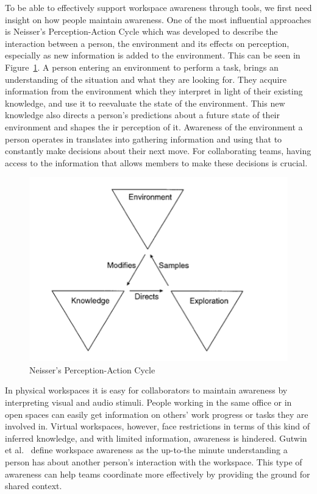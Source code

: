 \documentclass[conference]{IEEEtran}
\begin{document}
To be able to effectively support workspace awareness through tools, we first need insight on how people maintain awareness. One of the most influential approaches is Neisser's Perception-Action Cycle \cite{Neisser76} which was developed to describe the interaction between a person, the environment and its effects on perception, especially as new information is added to the environment.  This can be seen in Figure~\ref{fig:neisser}. A person entering an environment to perform a task, brings an understanding of the situation and what they are looking for. They acquire information from the environment which they interpret in light of their existing knowledge, and use it to reevaluate the state of the environment. This new knowledge also directs a person's predictions about a future state of their environment and shapes the  ir perception of it. Awareness of the environment a person operates in translates into gathering information and using that to constantly make decisions about their next move. For collaborating teams, having access to the information that allows members to make these decisions is crucial.


\begin{figure}[htb]
\centering
\includegraphics[scale=0.5]{neisser}
\caption{Neisser's Perception-Action Cycle}
\label{fig:neisser}
\end{figure}

In physical workspaces it is easy for collaborators to maintain awareness by interpreting visual and audio stimuli. People working in the same office or in open spaces can easily get information on others' work progress or tasks they are involved in. Virtual workspaces, however, face restrictions in terms of this kind of inferred knowledge, and with limited information, awareness is hindered. Gutwin et al.~\cite{GG96, GGR96} define workspace awareness as the up-to-the minute understanding a person has about another person's interaction with the workspace. This type of awareness can help teams coordinate more effectively by providing the ground for shared context. 
\end{document}
